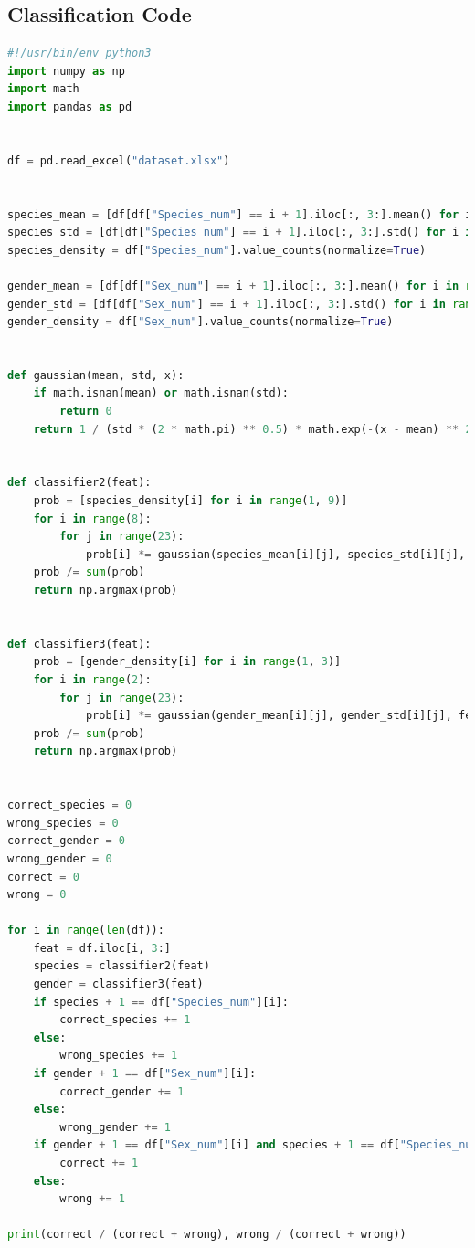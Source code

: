 \documentclass[12pt]{article}
\begin{document}
\subsection*{Classification Code}
\begin{lstlisting}[language=Python]
#!/usr/bin/env python3
import numpy as np
import math
import pandas as pd


df = pd.read_excel("dataset.xlsx")


species_mean = [df[df["Species_num"] == i + 1].iloc[:, 3:].mean() for i in range(8)]
species_std = [df[df["Species_num"] == i + 1].iloc[:, 3:].std() for i in range(8)]
species_density = df["Species_num"].value_counts(normalize=True)

gender_mean = [df[df["Sex_num"] == i + 1].iloc[:, 3:].mean() for i in range(3)]
gender_std = [df[df["Sex_num"] == i + 1].iloc[:, 3:].std() for i in range(3)]
gender_density = df["Sex_num"].value_counts(normalize=True)


def gaussian(mean, std, x):
    if math.isnan(mean) or math.isnan(std):
        return 0
    return 1 / (std * (2 * math.pi) ** 0.5) * math.exp(-(x - mean) ** 2 / (2 * std ** 2))


def classifier2(feat):
    prob = [species_density[i] for i in range(1, 9)]
    for i in range(8):
        for j in range(23):
            prob[i] *= gaussian(species_mean[i][j], species_std[i][j], feat[j])
    prob /= sum(prob)
    return np.argmax(prob)


def classifier3(feat):
    prob = [gender_density[i] for i in range(1, 3)]
    for i in range(2):
        for j in range(23):
            prob[i] *= gaussian(gender_mean[i][j], gender_std[i][j], feat[j])
    prob /= sum(prob)
    return np.argmax(prob)


correct_species = 0
wrong_species = 0
correct_gender = 0
wrong_gender = 0
correct = 0
wrong = 0

for i in range(len(df)):
    feat = df.iloc[i, 3:]
    species = classifier2(feat)
    gender = classifier3(feat)
    if species + 1 == df["Species_num"][i]:
        correct_species += 1
    else:
        wrong_species += 1
    if gender + 1 == df["Sex_num"][i]:
        correct_gender += 1
    else:
        wrong_gender += 1
    if gender + 1 == df["Sex_num"][i] and species + 1 == df["Species_num"][i]:
        correct += 1
    else:
        wrong += 1

print(correct / (correct + wrong), wrong / (correct + wrong))
\end{lstlisting}
\end{document}
